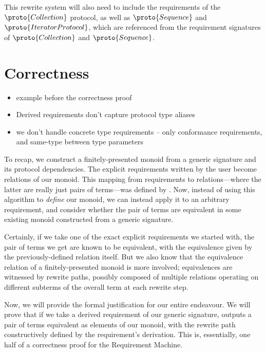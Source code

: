 \documentclass[../generics]{subfiles}
\begin{document}
This rewrite system will also need to include the requirements of the $\proto{Collection}$ protocol, as well as $\proto{Sequence}$ and $\proto{IteratorProtocol}$, which are referenced from the requirement signatures of $\proto{Collection}$ and $\proto{Sequence}$.

\section{Correctness}\label{rqm correctness}

\begin{itemize}
\item example before the correctness proof
\item Derived requirements don’t capture protocol type aliases
\item we don't handle concrete type requirements -- only conformance requirements, and same-type between type parameters
\end{itemize}

To recap, we construct a finitely-presented monoid from a generic signature and its protocol dependencies. The explicit requirements written by the user become relations of our monoid. This mapping from requirements to relations---where the latter are really just pairs of terms---was defined by . Now, instead of using this algorithm to \emph{define} our monoid, we can instead apply it to an arbitrary requirement, and consider whether the pair of terms are equivalent in some existing monoid constructed from a generic signature.

Certainly, if we take one of the exact explicit requirements we started with, the pair of terms we get are known to be equivalent, with the equivalence given by the previously-defined relation itself. But we also know that the equivalence relation of a finitely-presented monoid is more involved; equivalences are witnessed by rewrite paths, possibly composed of multiple relations operating on different subterms of the overall term at each rewrite step.

Now, we will provide the formal justification for our entire endeavour. We will prove that if we take a derived requirement of our generic signature,  outputs a pair of terms equivalent as elements of our monoid, with the rewrite path constructively defined by the requirement's derivation. This is, essentially, one half of a correctness proof for the Requirement Machine.
\end{document}
